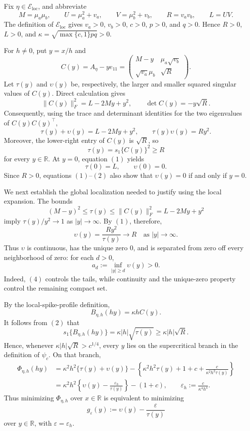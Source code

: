 Fix \(\eta\in\mathcal E_{\mathrm{loc}}\), and abbreviate
\[
 M=\mu_a\mu_b,\qquad U=\mu_a^2+v_a,\qquad V=\mu_b^2+v_b,\qquad R=v_av_b,\qquad L=UV.
\]
The definition of \(\mathcal E_{\mathrm{loc}}\) gives \(v_a>0\), \(v_b>0\), \(c>0\), \(p>0\), and \(q>0\).  Hence \(R>0\), \(L>0\), and \(\kappa=\sqrt{\max\{c,1\}pq}>0\).

For \(h\ne0\), put \(y=x/h\) and
\[
 C(y)=A_\eta-ye_{11}
 =\begin{pmatrix}
 M-y&\mu_a\sqrt{v_b}\\
 \sqrt{v_a}\mu_b&\sqrt{R}
 \end{pmatrix}.
\]
Let \(\tau(y)\) and \(\upsilon(y)\) be, respectively, the larger and smaller squared singular values of \(C(y)\).  Direct calculation gives
\[
 \|C(y)\|_F^2=L-2My+y^2,
 \qquad
 \det C(y)=-y\sqrt R.
\]
Consequently, using the trace and determinant identities for the two eigenvalues of \(C(y)C(y)^{\top}\),
\[
 \tau(y)+\upsilon(y)=L-2My+y^2,
 \qquad
 \tau(y)\upsilon(y)=Ry^2.                                      \tag{1}
\]
Moreover, the lower-right entry of \(C(y)\) is \(\sqrt R\), so
\[
 \tau(y)=s_1\{C(y)\}^2\ge R                                      \tag{2}
\]
for every \(y\in\mathbb R\).  At \(y=0\), equation \((1)\) yields
\[
 \tau(0)=L,\qquad \upsilon(0)=0.                                  \tag{3}
\]
Since \(R>0\), equations \((1)\)--\((2)\) also show that \(\upsilon(y)=0\) if and only if \(y=0\).

We next establish the global localization needed to justify using the local expansion.  The bounds
\[
 (M-y)^2\le \tau(y)\le \|C(y)\|_F^2=L-2My+y^2
\]
imply \(\tau(y)/y^2\to1\) as \(|y|\to\infty\).  By \((1)\), therefore,
\[
 \upsilon(y)=\frac{Ry^2}{\tau(y)}\longrightarrow R
 \quad\text{as }|y|\to\infty.                                    \tag{4}
\]
Thus \(\upsilon\) is continuous, has the unique zero \(0\), and is separated from zero off every neighborhood of zero: for each \(d>0\),
\[
 a_d:=\inf_{|y|\ge d}\upsilon(y)>0.                                \tag{5}
\]
Indeed, \((4)\) controls the tails, while continuity and the unique-zero property control the remaining compact set.

By the local-spike-profile definition,
\[
 B_{\eta,h}(hy)=\kappa h C(y).
\]
It follows from \((2)\) that
\[
 s_1\{B_{\eta,h}(hy)\}=\kappa|h|\sqrt{\tau(y)}
 \ge \kappa|h|\sqrt R.
\]
Hence, whenever \(\kappa|h|\sqrt R>c^{1/4}\), every \(y\) lies on the supercritical branch in the definition of \(\psi_c\).  On that branch,
\[
 \begin{aligned}
 \Phi_{\eta,h}(hy)
 &=\kappa^2h^2\{\tau(y)+\upsilon(y)\}
   -\left\{\kappa^2h^2\tau(y)+1+c+
   \frac{c}{\kappa^2h^2\tau(y)}\right\}\\
 &=\kappa^2h^2\left\{\upsilon(y)-
   \frac{\varepsilon_h}{\tau(y)}\right\}-(1+c),
 \qquad
 \varepsilon_h:=\frac{c}{\kappa^4h^4}.                            \tag{6}
 \end{aligned}
\]
Thus minimizing \(\Phi_{\eta,h}\) over \(x\in\mathbb R\) is equivalent to minimizing
\[
 g_\varepsilon(y):=\upsilon(y)-\frac{\varepsilon}{\tau(y)}         \tag{7}
\]
over \(y\in\mathbb R\), with \(\varepsilon=\varepsilon_h\).

